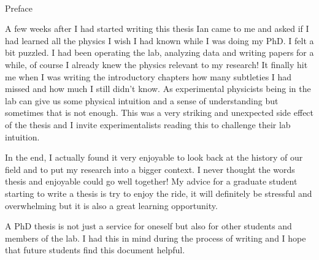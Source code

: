 
\renewcommand{\baselinestretch}{2}
\small\normalsize
\hbox{\ }
 
\vspace{-.65in}

\begin{center}
\large{Preface} 
\end{center} 

A few weeks after I had started writing this thesis Ian came to me and asked if I had learned all the physics I wish I had known while I was doing my PhD. I felt a bit puzzled. I had been operating the lab, analyzing data and writing papers for a while, of course I already knew the physics relevant to my research! It finally hit me when I was writing the introductory chapters how many subtleties I had missed and how much I still didn't know. As experimental physicists being in the lab can give us some physical intuition and a sense of understanding but sometimes that is not enough. This was a very striking and unexpected side effect of the thesis and I invite experimentalists reading this to challenge their lab intuition. 

In the end, I actually found it very enjoyable to look back at the history of our field and to put my research into a bigger context. I never thought the words thesis and  enjoyable could go well together! My advice for a graduate student starting to write a thesis is try to enjoy the ride, it will definitely be stressful and overwhelming but it is also a great learning opportunity. 

A PhD thesis is not just a service for oneself but also for other students and members of the lab. I had this in mind during the process of writing and I hope that future students find this document helpful. 
